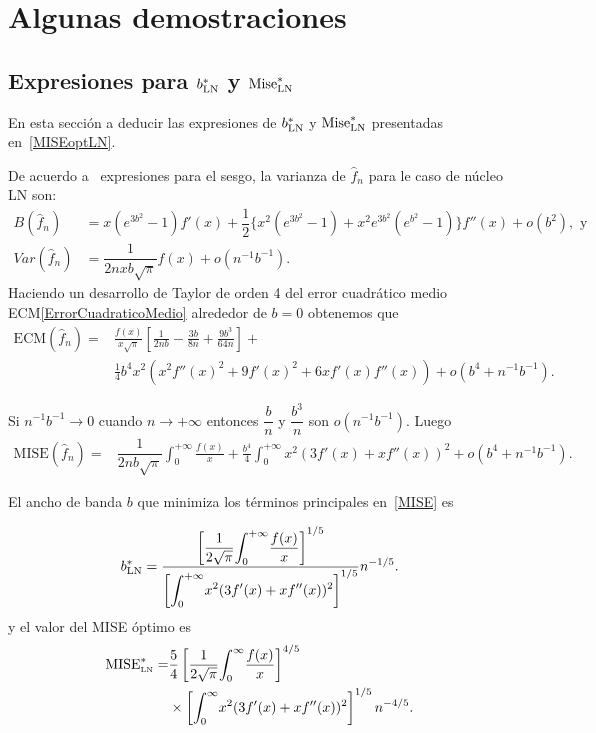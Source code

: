 \chapter{Algunas demostraciones}

\section*{Expresiones para $b_{\small{\text{LN}}}^*$ y $\text{Mise}_{\small{\text{LN}}}^*$}
\label{byMiseOptLN}

\noindent En esta sección a deducir las expresiones de  $b_{\small{\text{LN}}}^*$ y $\text{Mise}_{\small{\text{LN}}}^*$ presentadas en~\eqref{MISEoptLN}.

\begin{dem}
	De acuerdo a~\cite{Libnegue2013} expresiones para el sesgo, la varianza de $\widehat{f}_n$ para le caso de núcleo LN son:
	\begin{align}
	B(\widehat{f}_n)&=x(e^{3 b^2}-1) f'(x)+\dfrac{1}{2}\{x^2(e^{3 b^2}-1)+x^2 e^{3b^2}(e^{b^2}-1)\}f''(x)+o(b^2), \text{ y}\\
	Var(\widehat{f}_n)&=\dfrac{1}{2 n x b \sqrt{\pi}} f(x)+o(n^{-1}b^{-1}).
	\end{align}
	Haciendo un desarrollo de Taylor de orden 4 del error cuadrático medio ECM\eqref{ErrorCuadraticoMedio} alrededor de $b=0$ obtenemos que
	\begin{align}
	\text{ECM}(\widehat{f}_n)=&\frac{f(x)}{x \sqrt{\pi}}\left[\frac{1}{2 n b}-\frac{3 b}{8 n}+\frac{9 b^3}{64 n}\right]+\\
	&\frac{1}{4} b^4 x^2 \left(x^2 f''(x)^2+9 f'(x)^2+6 x f'(x) f''(x)\right)+o\left(b^4+n^{-1}b^{-1}\right).
	\end{align}
	
	Si $n^{-1}b^{-1} \to 0$ cuando $n \to +\infty$ entonces $\dfrac{b}{n}$ y $\dfrac{b^3}{n}$ son $o(n^{-1}b^{-1})$.
	Luego
	\begin{align}
	\label{MISE:apendice}
	\text{MISE}(\widehat{f}_n)=&\dfrac{1}{2 n b \sqrt{\pi}} \int_{0}^{+\infty}\frac{f(x)}{x}+\frac{b^4}{4} \int_{0}^{+\infty} x^2\left(3f'(x)+xf''(x)\right)^2+o\left(b^4+n^{-1}b^{-1}\right).
	\end{align}
	
	El ancho de banda $b$ que minimiza los términos principales en~\ref{MISE} es 
	
	\begin{align}
	b_{\small{\text{LN}}}^*=\dfrac{\left[\dfrac{1}{2\sqrt{\pi}}\displaystyle{\int_0^{+\infty}}\frac{f(x)}{x}\right]^{1/5}}{\left[\displaystyle{\int_0^{+\infty}} x^2(3f'(x)+xf''(x))^2\right]^{1/5}}n^{-1/5}.
	\end{align}
	y el valor del MISE óptimo es
	\begin{align}
	\text{MISE}^*_{\text{\tiny{LN}}}=&\dfrac{5}{4}  \left[\dfrac{1}{2\sqrt{\pi}}\displaystyle{\int_{0}^{\infty}} \frac{f(x)}{x} \right]^{4/5} \\
	&\times \left[\displaystyle{\int_{0}^{\infty}}  x^2 (3 f'(x) + x f''(x))^2 \right]^{1/5} n^{-4/5} .
	\end{align}
\end{dem}